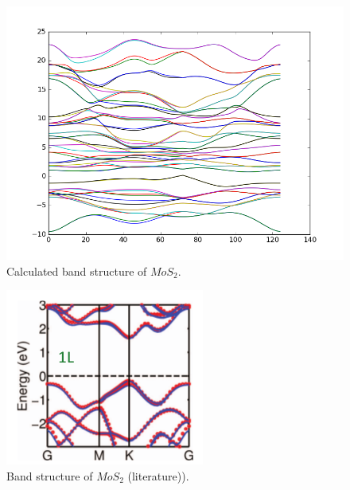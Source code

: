\documentclass{my_pracamgr}
\begin{document}
\begin{figure} 
\begin{center}
  \includegraphics[width=\linewidth]{img/mos2_mono_soc_S}
  \caption{Calculated band structure of $MoS_2$.}
\end{center}
\end{figure}  
\begin{figure} 
\begin{center}
  \includegraphics[width=0.5\linewidth]{img/MoS2_lit_band_struc}
  \caption{Band structure of $MoS_2$ (literature)).}
\end{center}
\end{figure}  

\newpage
\end{document}
